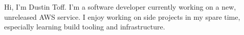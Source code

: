 \parbox {\textwidth} {
    Hi, I'm Dustin Toff. I'm a software developer currently working on a new, unreleased AWS service. I enjoy working on side projects in my spare time, especially learning build tooling and infrastructure.
}
